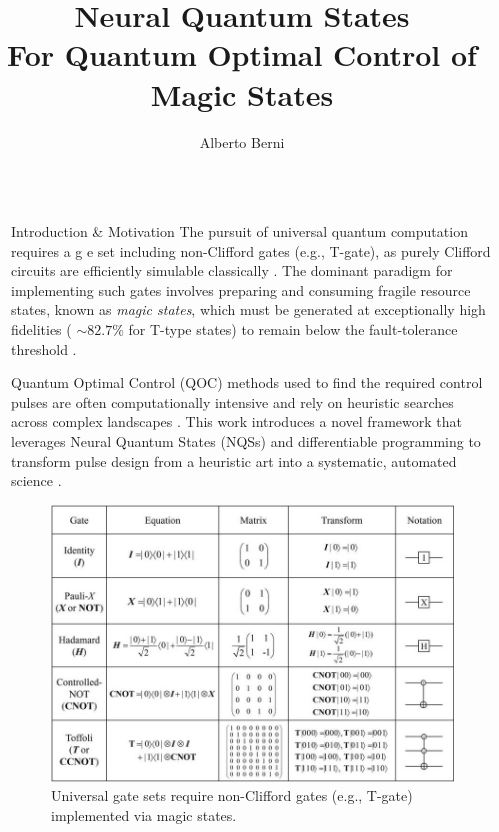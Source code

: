 \documentclass[final]{beamer}
\title{Neural Quantum States\\ \vspace{-10px} {\LARGE For Quantum Optimal Control of Magic States}}
\author{Alberto Berni}
\institute[shortinst]{University of Southampton}
\newlength{\sepwidth}
\newlength{\colwidth}
\newcommand{\separatorcolumn}{\begin{column}{\sepwidth}\end{column}}
\begin{document}
\begin{frame}[t]
\begin{columns}[t]
\separatorcolumn

\begin{column}{\colwidth}

    \begin{block}{Introduction \& Motivation}
        The pursuit of universal quantum computation requires a g e set including non-Clifford gates (e.g., T-gate), as purely Clifford circuits are efficiently simulable classically \cite{Lange2024Review}. The dominant paradigm for implementing such gates involves preparing and consuming fragile resource states, known as \textit{magic states}, which must be generated at exceptionally high fidelities ( $\sim82.7\%$ for T-type states) to remain below the fault-tolerance threshold \cite{Bravyi2012, Campbell2017, Raussendorf2007}.
    
        Quantum Optimal Control (QOC) methods used to find the required control pulses are often computationally intensive and rely on heuristic searches across complex landscapes \cite{Khaneja2005, Glaser2015}. This work introduces a novel framework that leverages Neural Quantum States (NQSs) and differentiable programming to transform pulse design from a heuristic art into a systematic, automated science \cite{Berni2025Proposal}.
        
        \begin{figure}
            \centering
            \includegraphics[width=0.3\paperwidth]{img/commonQuantumGates.png}
            \caption{\scriptsize Universal gate sets require non-Clifford gates (e.g., T-gate) implemented via magic states.}
        \end{figure}
    \end{block}


\end{column}
\end{columns}
\end{frame}
\end{document}
